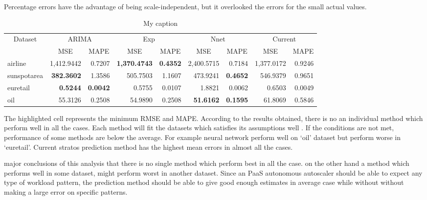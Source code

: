 Percentage errors have the advantage of being scale-independent, but it overlooked the errors for the small actual values.

\begin{table}[]
\centering
\caption{My caption}
\begin{tabular}{|l|r|r|r|r|r|r|r|r|}
\hline
\multicolumn{1}{|c|}{\multirow{2}{*}{Dataset}} & \multicolumn{2}{c|}{ARIMA} & \multicolumn{2}{c|}{Exp} & \multicolumn{2}{c|}{Nnet} & \multicolumn{2}{c|}{Current} \\ \cline{2-9} 
\multicolumn{1}{|c|}{} & \multicolumn{1}{c|}{MSE} & \multicolumn{1}{c|}{MAPE} & \multicolumn{1}{c|}{MSE} & \multicolumn{1}{c|}{MAPE} & \multicolumn{1}{c|}{MSE} & \multicolumn{1}{c|}{MAPE} & \multicolumn{1}{c|}{MSE} & \multicolumn{1}{c|}{MAPE} \\ \hline
airline & 1,412.9442 & 0.7207 & \textbf{1,370.4743} & \textbf{0.4352} & 2,400.5715 & 0.7184 & 1,377.0172 & 0.9246 \\ \hline
sunspotarea & \textbf{382.3602} & 1.3586 & 505.7503 & 1.1607 & 473.9241 & \textbf{0.4652} & 546.9379 & 0.9651 \\ \hline
euretail & \textbf{0.5244} & \textbf{0.0042} & 0.5755 & 0.0107 & 1.8821 & 0.0062 & 0.6503 & 0.0049 \\ \hline
oil & 55.3126 & 0.2508 & 54.9890 & 0.2508 & \textbf{51.6162} & \textbf{0.1595} & 61.8069 & 0.5846 \\ \hline
\end{tabular}
\end{table}




The highlighted cell represents the minimum RMSE and MAPE. According to the results obtained, there is no an individual method which perform well in all the cases. Each method will fit the datasets which satisfies its assumptions well . If the conditions are not met, performance of some methods are below the average. For example neural network perform well on ‘oil’ dataset but perform worse in ‘euretail’.  Current stratos prediction method has the highest mean errors in almost all the cases.

major conclusions of this analysis that there is no single method which perform best in all the case. on the other hand a method which performs well in some dataset, might perform worst in another dataset.
Since an PaaS autonomous autoscaler should be able to expect any type of workload pattern, the prediction method should be able to give good enough estimates in average case while without without making a large error on specific patterns.

